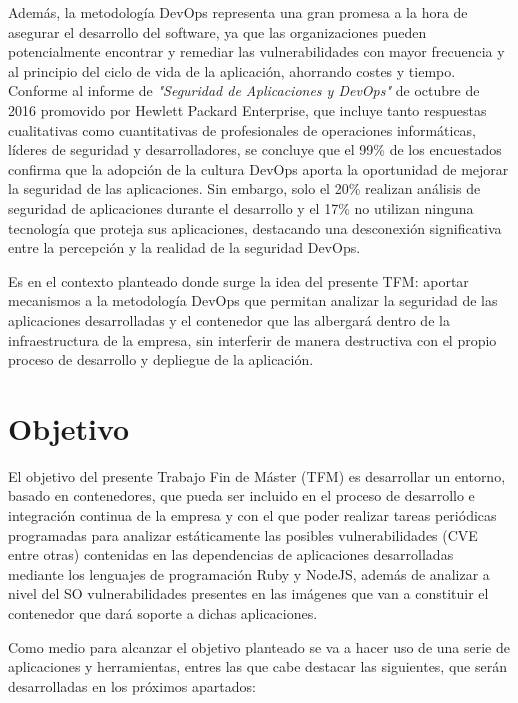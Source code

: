 Además, la metodología	 \gls{DevOps} representa una gran promesa a la hora de asegurar el desarrollo del software, ya que las organizaciones pueden potencialmente encontrar y remediar las vulnerabilidades con mayor frecuencia y al principio del ciclo de vida de la aplicación, ahorrando costes y tiempo. Conforme al informe de  \textit{"Seguridad de Aplicaciones y DevOps"} de octubre de 2016 promovido por Hewlett Packard Enterprise\cite{hpe2016}, que incluye tanto respuestas cualitativas como cuantitativas de profesionales de operaciones informáticas, líderes de seguridad y desarrolladores, se concluye que el 99\% de los encuestados confirma que la adopción de la cultura \gls{DevOps} aporta la oportunidad de mejorar la seguridad de las aplicaciones. Sin embargo, solo el 20\% realizan análisis de seguridad de aplicaciones durante el desarrollo y el 17\% no utilizan ninguna tecnología que proteja sus aplicaciones, destacando una desconexión significativa entre la percepción y la realidad de la seguridad \gls{DevOps}.

Es en el contexto planteado donde surge la idea del presente \gls{TFM}: aportar mecanismos a la metodología \gls{DevOps} que permitan analizar la seguridad de las aplicaciones desarrolladas y el contenedor que las albergará dentro de la infraestructura de la empresa, sin interferir de manera destructiva con el propio proceso de desarrollo y depliegue de la aplicación.

\section{Objetivo}

El objetivo del presente Trabajo Fin de Máster (\gls{TFM}) es desarrollar un entorno, basado en contenedores, que pueda ser incluido en el proceso de desarrollo e integración continua de la empresa y con el que poder realizar tareas periódicas programadas para analizar estáticamente las posibles vulnerabilidades (\gls{CVE} entre otras) contenidas en las dependencias de aplicaciones desarrolladas mediante los lenguajes de programación Ruby y NodeJS, además de analizar a nivel del \gls{SO} vulnerabilidades presentes en las imágenes que van a constituir el contenedor que dará soporte a dichas aplicaciones.

Como medio para alcanzar el objetivo planteado se va a hacer uso de una serie de aplicaciones y herramientas, entres las que cabe destacar las siguientes, que serán desarrolladas en los próximos apartados:

